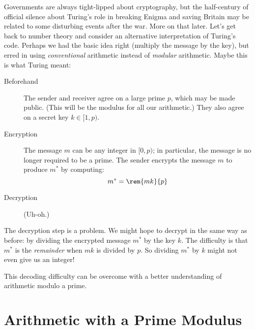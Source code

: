 Governments are always tight-lipped about cryptography, but the half-century of official
silence about Turing's role in breaking Enigma and saving Britain may be related to some
disturbing events after the war.  More on that later.  Let's get back to number theory and
consider an alternative interpretation of Turing's code.  Perhaps we had the basic idea
right (multiply the message by the key), but erred in using \emph{conventional} arithmetic
instead of \emph{modular} arithmetic.  Maybe this is what Turing meant:
\begin{description}

\item[Beforehand] The sender and receiver agree on a large prime $p$, which may be made
  public.  (This will be the modulus for all our arithmetic.)  They also agree on a secret
  key $k \in [1, p)$.

\item[Encryption] The message $m$ can be any integer in $[0, p)$; in particular, the
  message is no longer required to be a prime.  The sender encrypts the message $m$ to
  produce $m^*$ by computing:
\begin{equation}
m^* = \rem{mk}{p} \label{eq:turing-code}
\end{equation}

\item[Decryption] (Uh-oh.)

\end{description}

The decryption step is a problem.  We might hope to decrypt in the same way as before: by
dividing the encrypted message $m^*$ by the key $k$.  The difficulty is that $m^*$ is the
\emph{remainder} when $mk$ is divided by $p$.  So dividing $m^*$ by $k$ might not even give
us an integer!

This decoding difficulty can be overcome with a better understanding of arithmetic modulo a
prime.

\begin{problems}
\practiceproblems
{}

\homeworkproblems
{}

\classproblems
{}

\examproblems
{}
\end{problems}

\section{Arithmetic with a Prime Modulus}\label{mod_prime_sec}

